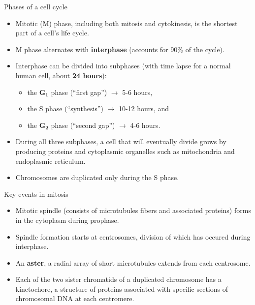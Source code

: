 \documentclass[11pt,ignorenonframetext,aspectratio=169]{beamer}
\providecommand{\tightlist}{%
  \setlength{\itemsep}{0pt}\setlength{\parskip}{0pt}}
\begin{document}
\begin{frame}{Phases of a cell cycle}
\protect\hypertarget{phases-of-a-cell-cycle}{}
\begin{itemize}
\tightlist
\item
  Mitotic (M) phase, including both mitosis and cytokinesis, is the
  shortest part of a cell's life cycle.
\item
  M phase alternates with \textbf{interphase} (accounts for 90\% of the
  cycle).
\item
  Interphase can be divided into subphases (with time lapse for a normal
  human cell, about \textbf{24 hours}):

  \begin{itemize}
  \tightlist
  \item
    the \(\mathbf{G_1}\) phase (``first gap'') \(\longrightarrow\) 5-6
    hours,
  \item
    the S phase (``synthesis'') \(\longrightarrow\) 10-12 hours, and
  \item
    the \(\mathbf{G_2}\) phase (``second gap'') \(\longrightarrow\) 4-6
    hours.
  \end{itemize}
\item
  During all three subphases, a cell that will eventually divide grows
  by producing proteins and cytoplasmic organelles such as mitochondria
  and endoplasmic reticulum.
\item
  Chromosomes are duplicated only during the S phase.
\end{itemize}
\end{frame}

\begin{frame}{Key events in mitosis}
\protect\hypertarget{key-events-in-mitosis}{}
\begin{itemize}
\tightlist
\item
  Mitotic spindle (consists of microtubules fibers and associated
  proteins) forms in the cytoplasm during prophase.
\item
  Spindle formation starts at centrosomes, division of which has occured
  during interphase.
\item
  An \textbf{aster}, a radial array of short microtubules extends from
  each centrosome.
\item
  Each of the two sister chromatids of a duplicated chromosome has a
  kinetochore, a structure of proteins associated with specific sections
  of chromosomal DNA at each centromere.
\end{itemize}
\end{frame}
\end{document}
